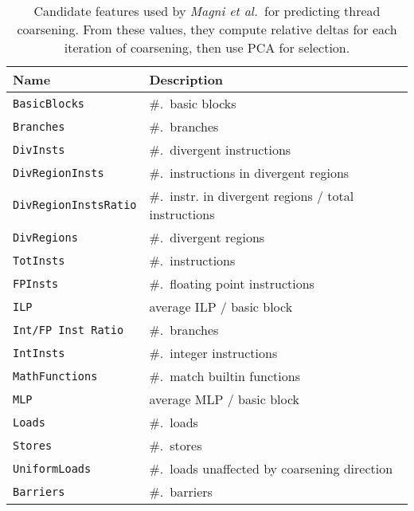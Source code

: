 \begin{table}
  \centering%
    \begin{tabular}{| l l |}
      \hline
      \rowcolor{gray!50}
      \textbf{Name} & \textbf{Description} \\
      \hline
      \texttt{BasicBlocks} & \#.\ basic blocks \\
      \texttt{Branches} & \#.\ branches \\
      \texttt{DivInsts} & \#.\ divergent instructions \\
      \texttt{DivRegionInsts} & \#.\ instructions in divergent regions \\
      \texttt{DivRegionInstsRatio} & \#.\ instr. in divergent regions / total instructions \\
      \texttt{DivRegions} & \#.\ divergent regions \\
      \texttt{TotInsts} & \#.\ instructions \\
      \texttt{FPInsts} & \#.\ floating point instructions \\
      \texttt{ILP} & average ILP / basic block \\
      \texttt{Int/FP Inst Ratio} & \#.\ branches \\
      \texttt{IntInsts} & \#.\ integer instructions \\
      \texttt{MathFunctions} & \#.\ match builtin functions \\
      \texttt{MLP} & average MLP / basic block \\
      \texttt{Loads} & \#.\ loads \\
      \texttt{Stores} & \#.\ stores \\
      \texttt{UniformLoads} & \#.\ loads unaffected by coarsening direction \\
      \texttt{Barriers} & \#.\ barriers \\
      \hline
    \end{tabular}%
    \label{tab:features-pact14-raw}%
  \caption[\emph{Magni et al.\ }features for predicting thread coarsening]{%
    Candidate features used by \emph{Magni et al.\ }for predicting thread
    coarsening. From these values, they compute relative deltas for each
    iteration of coarsening, then use PCA for selection.%
  }%
  \label{tab:magni-features} %
\end{table}
